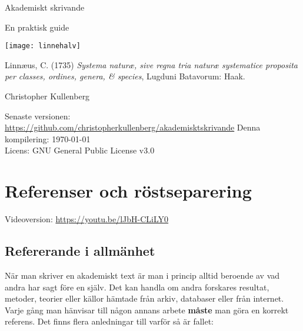 \documentclass[11pt,a5paper,footinclude=true,headinclude=true]{scrbook} %
\begin{document}
\thispagestyle{empty}
\begin{center}
\begin{LARGE}
Akademiskt skrivande
\end{LARGE}

\bigskip
En praktisk guide


\texttt{[image: linnehalv]}

\begin{scriptsize}
\noindent Linnæus, C. (1735) \emph{Systema naturæ, sive regna tria naturæ systematice proposita per classes, ordines, genera, \& species}, Lugduni Batavorum: Haak.
\end{scriptsize}
\end{center}

\bigskip
\bigskip
\bigskip

\begin{scriptsize}
\noindent Christopher Kullenberg

\noindent Senaste versionen: \href{https://github.com/christopherkullenberg/akademisktskrivande}{https://github.com/christopherkullenberg/akademisktskrivande}
\noindent Denna kompilering: \today
\\
\noindent Licens: GNU General Public License v3.0
\end{scriptsize}

\newpage %
\AtBeginShipoutNext{\AtBeginShipoutDiscard}%

	\tableofcontents
	\thispagestyle{empty}

\newpage %
\AtBeginShipoutNext{\AtBeginShipoutDiscard}%





\chapter{Referenser och röstseparering}

Videoversion: \href{https://youtu.be/lJbH-CLiLY0}{https://youtu.be/lJbH-CLiLY0}

\section{Refererande i allmänhet}

När man skriver en akademiskt text är man i princip alltid beroende av vad andra har sagt före en själv. Det kan handla om andra forskares resultat, metoder, teorier eller källor hämtade från arkiv, databaser eller från internet. Varje gång man hänvisar till någon annans arbete \textbf{måste} man göra en korrekt referens. Det finns flera anledningar till varför så är fallet:
\end{document}
